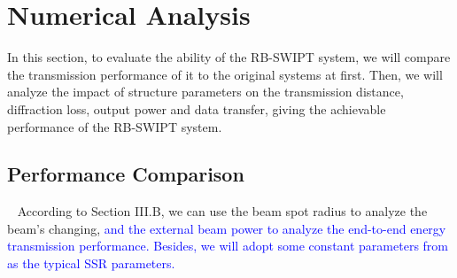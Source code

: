 \documentclass{IEEEtran}
\begin{document}
\section{Numerical Analysis}\label{performance}
In this section, to evaluate the ability of the RB-SWIPT system, we will compare the transmission performance of it to the original systems at first. Then, we will analyze the impact of structure parameters on the transmission distance, diffraction loss, output power and data transfer, giving the achievable performance of the RB-SWIPT system.
\subsection{Performance Comparison}\
According to Section III.B, we can use the beam spot radius to analyze the beam's changing, \textcolor{blue}{and the external beam power to analyze the end-to-end energy transmission performance.
Besides, we will adopt some constant parameters from \cite{wang2019wireless,koechner2013solid} as the typical SSR parameters.}
\end{document}

